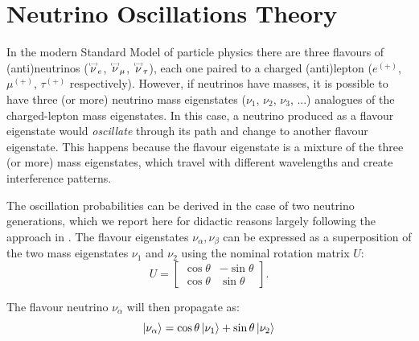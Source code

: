 \section{Neutrino Oscillations Theory}
In the modern Standard Model of particle physics there are three flavours of (anti)neutrinos ($\overset{\textbf{\fontsize{3pt}{3pt}\selectfont(---)}}{\nu}_{e}$, $\overset{\textbf{\fontsize{3pt}{3pt}\selectfont(---)}}{\nu}_{\mu}$, $\overset{\textbf{\fontsize{3pt}{3pt}\selectfont(---)}}{\nu}_{\tau}$), each one paired to a charged (anti)lepton ($e^{(+)}$, $\mu^{(+)}$, $\tau^{(+)}$ respectively). 
However, if neutrinos have masses, it is possible to have three (or more) neutrino mass eigenstates ($\nu_{1}$, $\nu_{2}$, $\nu_{3}$, ...) analogues of the charged-lepton mass eigenstates. 
In this case, a neutrino produced as a flavour eigenstate would \emph{oscillate} through its path and change to another flavour eigenstate. This happens because the flavour eigenstate is a mixture of the three (or more) mass eigenstates, which travel with different wavelengths and create interference patterns. 

The oscillation probabilities can be derived in the case of two neutrino generations, which we report here for didactic reasons largely following the approach in \cite{deGouvea:2004gd}. The flavour eigenstates $\nu_{\alpha}, \nu_{\beta}$ can be expressed as a superposition of the two mass eigenstates $\nu_1$ and $\nu_2$ using the nominal rotation matrix $U$:
\begin{equation}
U = \begin{bmatrix}
    \cos\theta & -\sin\theta \\
    \cos\theta & \sin\theta
    \end{bmatrix}.
\end{equation}

The flavour neutrino $\nu_{\alpha}$ will then propagate as: 
\begin{equation}
    \ket{\nu_{\alpha}} = \cos\theta\ket{\nu_{1}}+\sin\theta\ket{\nu_{2}}
\end{equation}

